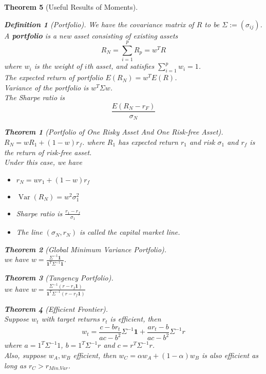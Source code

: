 \documentclass[12pt]{article}
\newtheorem{definition}{Definition}[section]
\newtheorem{theorem}{Theorem}[section]
\theoremstyle{definition}
\DeclareMathOperator{\var}{Var}
\begin{document}
\begin{theorem}[Useful Results of Moments]
\begin{definition}[Portfolio]
We have the covariance matrix of $R$ to be $\Sigma:=(\sigma_{ij})$.\\
A \textbf{portfolio} is a new asset consisting of existing assets
\[
R_N=\sum_{i=1}^p R_p = w^TR
\]
where $w_i$ is the weight of $i$th asset, and satisfies $\sum_{i=1}^p w_i = 1$.\\
The expected return of portfolio $E(R_N)=w^TE(R)$.\\
Variance of the portfolio is $w^T\Sigma w$.\\
The Sharpe ratio is
\[
\frac{E(R_N-r_F)}{\sigma_N}
\]
\end{definition}
\begin{theorem}[Portfolio of One Risky Asset And One Risk-free Asset]
\hfill\\\normalfont $R_N=wR_1+(1-w)r_f$. where $R_1$ has expected return $r_1$ and risk $\sigma_1$ and $r_f$ is the return of risk-free asset.\\
Under this case, we have
\begin{itemize}
  \item $r_N=wr_1 + (1-w)r_f$
  \item $\var(R_N)=w^2\sigma_1^2$
  \item Sharpe ratio is $\frac{r_1-r_f}{\sigma_1}$
  \item The line $(\sigma_N, r_N)$ is called the capital market line.
\end{itemize}
\end{theorem}
\begin{theorem}[Global Minimum Variance Portfolio]
\hfill\\\normalfont we have $w=\frac{\Sigma^{-1}\mathbf{1}}{\mathbf{1}^T\Sigma^{-1}\mathbf{1}}$.
\end{theorem}
\begin{theorem}[Tangency Portfolio]
\hfill\\\normalfont we have $w=\frac{\Sigma^{-1}(r-r_f\mathbf{1})}{\mathbf{1}^T\Sigma^{-1}(r-r_f\mathbf{1})}$
\end{theorem}
\begin{theorem}[Efficient Frontier]
\hfill\\\normalfont Suppose $w_t$ with target returns $r_t$ is efficient, then
\[
w_t=\frac{c-br_t}{ac-b^2}\Sigma^{-1}\mathbf{1}+\frac{ar_t-b}{ac-b^2}\Sigma^{-1}r
\]
where $a=1^T\Sigma^{-1}1$, $b=1^T\Sigma^{-1}r$ and $c=r^T\Sigma^{-1}r$.\\
Also, suppose $w_A, w_B$ efficient, then $w_C=\alpha w_A + (1-\alpha)w_B$ is also efficient as long as $r_C>r_{Min.Var}$.
\end{theorem}
\clearpage

\end{theorem}
\end{document}
